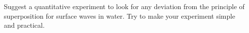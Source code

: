 Suggest a quantitative experiment to look for any deviation from the
principle of superposition for surface waves in water.  
Try to make your experiment simple and
practical.
